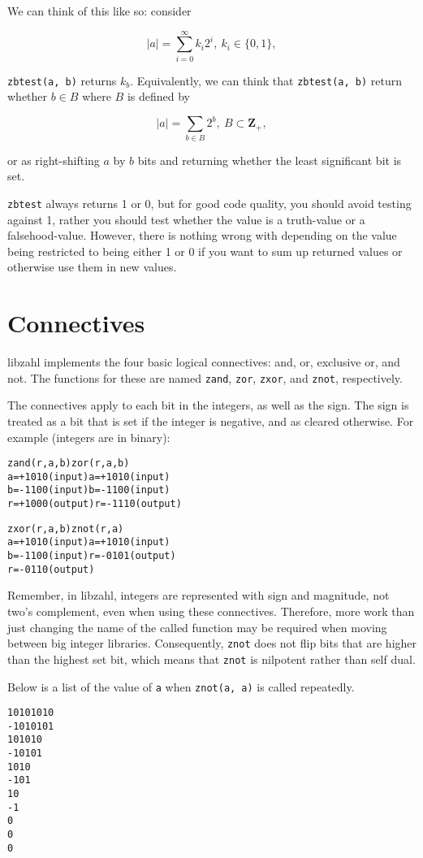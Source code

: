 We can think of this like so: consider

$$ \lvert a \rvert = \sum_{i = 0}^\infty k_i 2^i,~ k_i \in \{0, 1\}, $$

\noindent
{\tt zbtest(a, b)} returns $k_b$. Equivalently, we can
think that {\tt zbtest(a, b)} return whether $b \in B$
where $B$ is defined by

$$ \lvert a \rvert = \sum_{b \in B} 2^b,~ B \subset \textbf{Z}_+, $$

\noindent
or as right-shifting $a$ by $b$ bits and returning
whether the least significant bit is set.

{\tt zbtest} always returns 1 or 0, but for good
code quality, you should avoid testing against 1,
rather you should test whether the value is a
truth-value or a falsehood-value. However, there
is nothing wrong with depending on the value being
restricted to being either 1 or 0 if you want to
sum up returned values or otherwise use them in
new values.


\newpage
\section{Connectives}
\label{sec:Connectives}

libzahl implements the four basic logical
connectives: and, or, exclusive or, and not.
The functions for these are named {\tt zand},
{\tt zor}, {\tt zxor}, and {\tt znot},
respectively.

The connectives apply to each bit in the
integers, as well as the sign. The sign is
treated as a bit that is set if the integer
is negative, and as cleared otherwise. For
example (integers are in binary):

\begin{alltt}
   zand(r, a, b)              zor(r, a, b)
   a = +1010  (input)         a = +1010  (input)
   b = -1100  (input)         b = -1100  (input)
   r = +1000  (output)        r = -1110  (output)

   zxor(r, a, b)              znot(r, a)
   a = +1010  (input)         a = +1010  (input)
   b = -1100  (input)         r = -0101  (output)
   r = -0110  (output)
\end{alltt}

Remember, in libzahl, integers are represented
with sign and magnitude, not two's complement,
even when using these connectives. Therefore,
more work than just changing the name of the
called function may be required when moving
between big integer libraries. Consequently,
{\tt znot} does not flip bits that are higher
than the highest set bit, which means that
{\tt znot} is nilpotent rather than self dual.

Below is a list of the value of {\tt a} when
{\tt znot(a, a)} is called repeatedly.

\begin{alltt}
   10101010
   -1010101
     101010
     -10101
       1010
       -101
         10
         -1
          0
          0
          0
\end{alltt}
